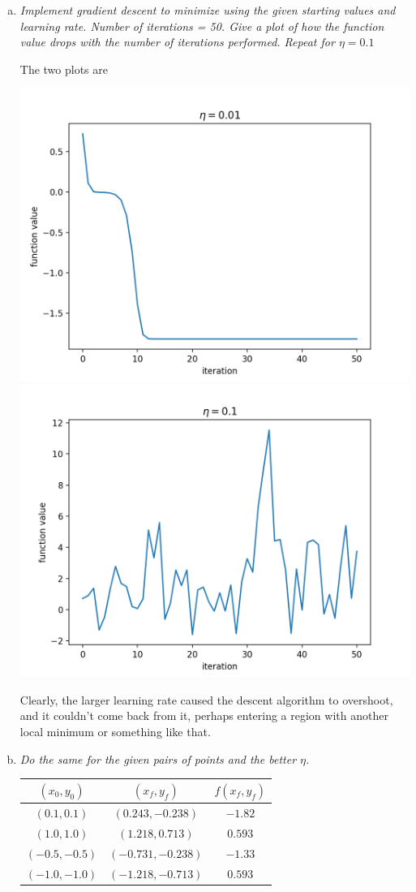 \documentclass{article}
\begin{document}
\begin{enumerate}[(a)]
  \item \textit{Implement gradient descent to minimize using the given starting values and
    learning rate. Number of iterations = 50. Give a plot of how the function value drops with
    the number of iterations performed. Repeat for $\eta = 0.1$}

    The two plots are
    
    \begin{center}
      \includegraphics[width=.45\textwidth]{2asmalleta.png}
      \includegraphics[width=.45\textwidth]{2abigeta.png}
    \end{center}

    Clearly, the larger learning rate caused the descent algorithm to overshoot, and it couldn't
    come back from it, perhaps entering a region with another local minimum or something like that.

  \item \textit{Do the same for the given pairs of points and the better $\eta$.}

    \begin{center}
      \begin{tabular}{c | c c}
        $(x_0, y_0)$ & $(x_f, y_f)$ & $f(x_f, y_f)$ \\[0.5ex]
        \hline
        $(0.1,0.1)$ & $(0.243,-0.238)$ & $-1.82$ \\
        $(1.0,1.0)$ & $(1.218,0.713)$ & $0.593$ \\
        $(-0.5,-0.5)$ & $(-0.731,-0.238)$ & $-1.33$ \\
        $(-1.0,-1.0)$ & $(-1.218,-0.713)$ & $0.593$ \\
      \end{tabular}
    \end{center}

\end{enumerate}
\end{document}
